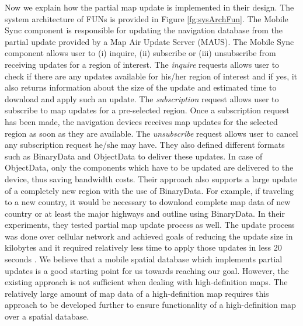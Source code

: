 Now we explain how the partial map update is implemented in their design. The system architecture of FUNs is provided in Figure \ref{fg:sysArchFun}. The Mobile Sync component is responsible for updating the navigation database from the partial update provided by a Map Air Update Server (MAUS). The Mobile Sync component allows user to (i) inquire, (ii) subscribe or (iii) unsubscribe from receiving updates for a region of interest. The \textit{inquire} requests allows user to check if there are any updates available for his/her region of interest and if yes, it also returns information about the size of the update and estimated time to download and apply such an update. The \textit{subscription} request allows user to subscribe to map updates for a pre-selected region. Once a subscription request has been made, the navigation devices receives map updates for the selected region as soon as they are available. The \textit{unsubscribe} request allows user to cancel any subscription request he/she may have. They also defined different formats such as BinaryData and ObjectData to deliver these updates. In case of ObjectData, only the components which have to be updated are delivered to the device, thus saving bandwidth costs. Their approach also supports a large update of a completely new region with the use of BinaryData. For example, if traveling to a new country, it would be necessary to download complete map data of new country or at least the major highways and outline using BinaryData. In their experiments, they tested partial map update process as well. The update process was done over cellular network and achieved goals of reducing the update size in kilobytes and it required relatively less time to apply those updates in less 20 seconds \cite{min2008mobile}. We believe that a mobile spatial database which implements partial updates is a good starting point for us towards reaching our goal. However, the existing approach is not sufficient when dealing with high-definition maps. The relatively large amount of map data of a high-definition map requires this approach to be developed further to ensure functionality of a high-definition map over a spatial database. 


